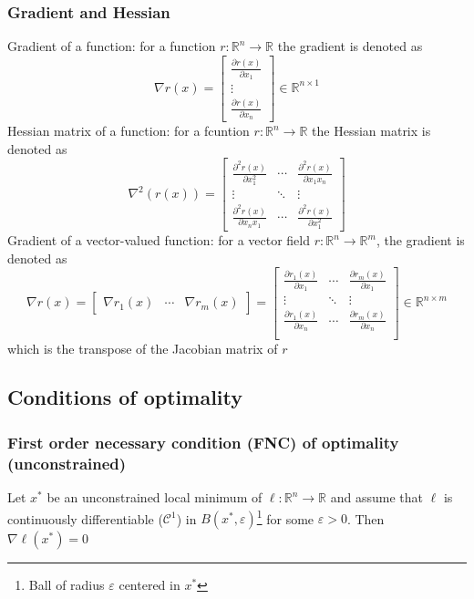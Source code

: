 \documentclass[openany]{book}
\newcommand{\R}{\mathbb{R}} %
\theoremstyle{definition}
\theoremstyle{remark}
\begin{document}
\subsubsection{Gradient and Hessian}
Gradient of a function: for a function $r:\R^n\to\R$  the gradient is denoted as 
\[
    \nabla r(x) = \begin{bmatrix}
        \displaystyle\frac{\partial r(x)}{\partial x_1} \\ \vdots \\ \displaystyle\frac{\partial r(x)}{\partial x_n}
    \end{bmatrix} \in \R^{n\times 1}
\]
Hessian matrix of a function: for a fcuntion $r:\R^n\to\R$  the Hessian matrix is denoted as 
\[
    \nabla^2(r(x)) = \begin{bmatrix}
        \displaystyle\frac{\partial^2 r(x)}{\partial x_1^2} & \cdots & \displaystyle\frac{\partial^2 r(x)}{\partial x_1x_n} \\ \vdots & \ddots & \vdots \\ \displaystyle\frac{\partial^2 r(x)}{\partial x_nx_1} & \cdots & \displaystyle\frac{\partial^2 r(x)}{\partial x_1^2}
    \end{bmatrix}
\]
Gradient of a vector-valued function: for a vector field $r:\R^n\to\R^m$, the gradient is denoted as 
\[
    \nabla r(x) = \begin{bmatrix}
        \nabla r_1(x) & \cdots & \nabla r_m(x)
    \end{bmatrix} = \begin{bmatrix}
        \displaystyle\frac{\partial r_1(x)}{\partial x_1} & \cdots & \displaystyle\frac{\partial r_m(x)}{\partial x_1} \\
        \vdots & \ddots & \vdots \\
        \displaystyle\frac{\partial r_1(x)}{\partial x_n} & \cdots & \displaystyle\frac{\partial r_m(x)}{\partial x_n} \\
    \end{bmatrix} \in \R^{n\times m}
\]
which is the transpose of the Jacobian matrix of $r$
\subsection{Conditions of optimality}
\subsubsection{First order necessary condition (FNC) of optimality (unconstrained)}
Let $x^*$ be an unconstrained local minimum of $\ell:\R^n\to\R$ and assume that $\ell$ is continuously differentiable ($\mathcal{C}^1$) in $B(x^*,\varepsilon)$\footnote{Ball of radius $\varepsilon$ centered in $x^*$} for some $\varepsilon>0$. Then $\nabla \ell(x^*)=0$
\end{document}
